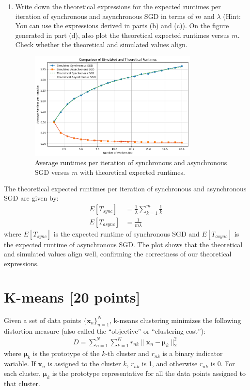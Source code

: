 \documentclass[a3paper,12pt]{extarticle} %
\begin{document}
\begin{enumerate}
\item
Write down the theoretical expressions for the expected runtimes per iteration of synchronous and asynchronous SGD in terms of $m$ and $\lambda$ (Hint: You can use the expressions derived in parts (b) and (c)). On the figure generated in part (d), also plot the theoretical expected runtimes versus $m$. Check whether the theoretical and simulated values align.
\begin{figure}[H]
\centering
\includegraphics[width=0.8\textwidth]{theoriticalVPlotted.png}
\caption{Average runtimes per iteration of synchronous and asynchronous SGD versus $m$ with theoretical expected runtimes.}
\end{figure}
\end{enumerate}
The theoretical expected runtimes per iteration of synchronous and asynchronous SGD are given by:
\begin{align}
E[T_{sync}] &= \frac{1}{\lambda} \sum_{k=1}^m \frac{1}{k}\\
E[T_{async}] &= \frac{1}{m\lambda}
\end{align}
where $E[T_{sync}]$ is the expected runtime of synchronous SGD and $E[T_{async}]$ is the expected runtime of asynchronous SGD. The plot shows that the theoretical and simulated values align well, confirming the correctness of our theoretical expressions.

\newpage
\section{K-means [20 points]}

Given a set of data points $\{\mathbf{x}_n\}_{n=1}^N$, k-means clustering minimizes the following distortion measure (also called the ``objective'' or ``clustering cost''):
\begin{align}
D = \sum_{n=1}^N \sum_{k=1}^K r_{nk} \|\mathbf{x}_n - \boldsymbol{\mu}_k\|^2_2
\end{align}
where $\boldsymbol{\mu}_k$ is the prototype of the $k$-th cluster and $r_{nk}$ is a binary indicator variable. If $\mathbf{x}_n$ is assigned to the cluster $k$, $r_{nk}$ is 1, and otherwise $r_{nk}$ is 0. For each cluster, $\boldsymbol{\mu}_k$ is the prototype representative for all the data points assigned to that cluster.
\end{document}
